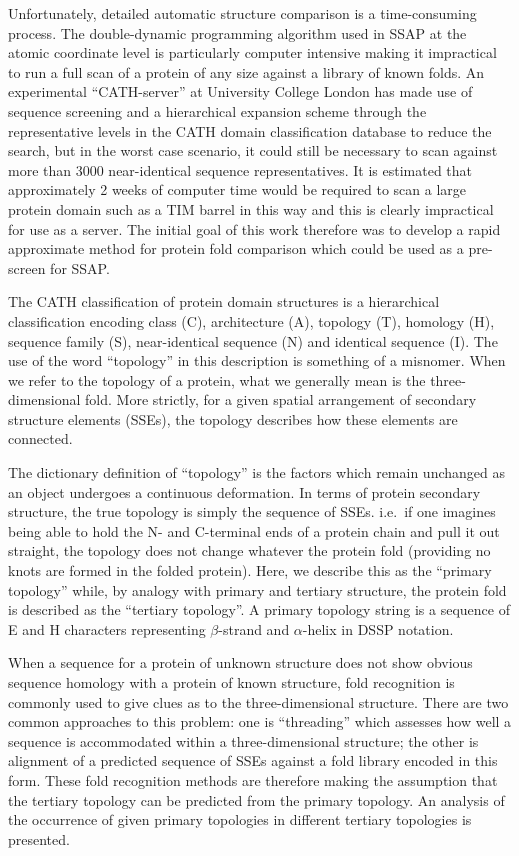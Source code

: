 \documentclass{article}
\begin{document}
Unfortunately, detailed automatic structure comparison is a
time-consuming process. The double-dynamic programming algorithm used
in SSAP\cite{taylor:alignment} at the atomic coordinate level is
particularly computer intensive making it impractical to run a full
scan of a protein of any size against a library of known folds.  An
experimental ``CATH-server'' at University College
London\cite{orengo:classifying} has made use of sequence screening and
a hierarchical expansion scheme through the representative levels in
the CATH domain classification database\cite{orengo:cath} to reduce
the search, but in the worst case scenario, it could still be
necessary to scan against more than 3000 near-identical sequence
representatives. It is estimated that approximately 2 weeks of computer time
would be required to scan a large protein domain such as a TIM barrel
in this way and this is clearly impractical for use as a server. The
initial goal of this work therefore was to develop a rapid approximate
method for protein fold comparison which could be used as a pre-screen
for SSAP.

The CATH classification of protein domain structures is a hierarchical
classification encoding class (C), architecture (A), topology (T),
homology (H), sequence family (S), near-identical sequence (N) and
identical sequence (I). The use of the word ``topology'' in this
description is something of a misnomer. When we refer to the topology
of a protein, what we generally mean is the three-dimensional
fold. More strictly, for a given spatial arrangement of secondary
structure elements (SSEs), the topology describes how these elements
are connected.

The dictionary definition of ``topology'' is the factors which remain
unchanged as an object undergoes a continuous deformation.  In terms
of protein secondary structure, the true topology is simply the
sequence of SSEs.  i.e.\ if one imagines being able to hold the N- and
C-terminal ends of a protein chain and pull it out straight, the
topology does not change whatever the protein fold (providing no knots
are formed in the folded protein).  Here, we describe this as the
``primary topology'' while, by analogy with primary and tertiary
structure, the protein fold is described as the ``tertiary
topology''. A primary topology string is a sequence of E and H
characters representing $\beta$-strand and $\alpha$-helix in DSSP
notation\cite{kabsch:dictionary}.

When a sequence for a protein of unknown structure does not show
obvious sequence homology with a protein of known structure, fold
recognition is commonly used to give clues as to the three-dimensional
structure. There are two common approaches to this problem: one is
``threading'' which assesses how well a sequence is accommodated
within a three-dimensional structure\cite[for
example]{jones:threading}; the other is alignment of a predicted
sequence of SSEs against a fold library encoded in this form\cite[for
example]{russell:foldrec,rost:foldrec}.  These fold recognition
methods are therefore making the assumption that the tertiary topology
can be predicted from the primary topology. An analysis of the
occurrence of given primary topologies in different tertiary
topologies is presented.
\end{document}
